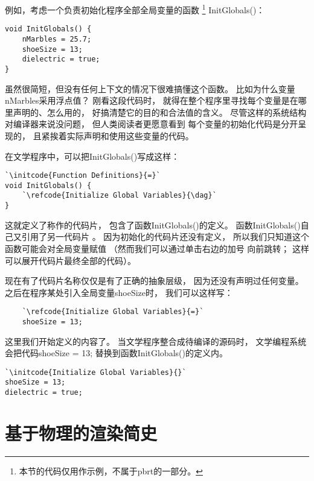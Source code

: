 例如，考虑一个负责初始化程序全部全局变量的函数
\footnote{本节的代码仅用作示例，不属于pbrt的一部分。}
{\ttfamily InitGlobals()}：
\begin{lstlisting}
void InitGlobals() {
    nMarbles = 25.7;
    shoeSize = 13;
    dielectric = true;
}
\end{lstlisting}

虽然很简短，但没有任何上下文的情况下很难搞懂这个函数。
比如为什么变量{\ttfamily nMarbles}采用浮点值？
刚看这段代码时，
就得在整个程序里寻找每个变量是在哪里声明的、怎么用的，
好搞清楚它的目的和合法值的含义。
尽管这样的系统结构对编译器来说没问题，
但人类阅读者更愿意看到
每个变量的初始化代码是分开呈现的，
且紧挨着实际声明和使用这些变量的代码。

在文学程序中，可以把{\ttfamily InitGlobals()}写成这样：
\begin{lstlisting}
`\initcode{Function Definitions}{=}`
void InitGlobals() {
    `\refcode{Initialize Global Variables}{\dag}`
}
\end{lstlisting}

这就定义了称作的代码片，
包含了函数{\ttfamily InitGlobals()}的定义。
函数{\ttfamily InitGlobals()}自己又引用了另一代码片
。
因为初始化的代码片还没有定义，
所以我们只知道这个函数可能会对全局变量赋值
（然而我们可以通过单击右边的加号
向前跳转；
这样可以展开代码片最终全部的代码）。

现在有了代码片名称仅仅是有了正确的抽象层级，
因为还没有声明过任何变量。
之后在程序某处引入全局变量{\ttfamily shoeSize}时，
我们可以这样写：
\begin{lstlisting}
    `\refcode{Initialize Global Variables}{=}`
    shoeSize = 13;
\end{lstlisting}

这里我们开始定义的内容了。
当文学程序整合成待编译的源码时，
文学编程系统会把代码{\ttfamily shoeSize = 13;}
替换到函数{\ttfamily InitGlobals()}的定义内。

\begin{lstlisting}
`\initcode{Initialize Global Variables}{}`
shoeSize = 13;
dielectric = true;
\end{lstlisting}
\section{基于物理的渲染简史}\label{sec:基于物理的渲染简史}

